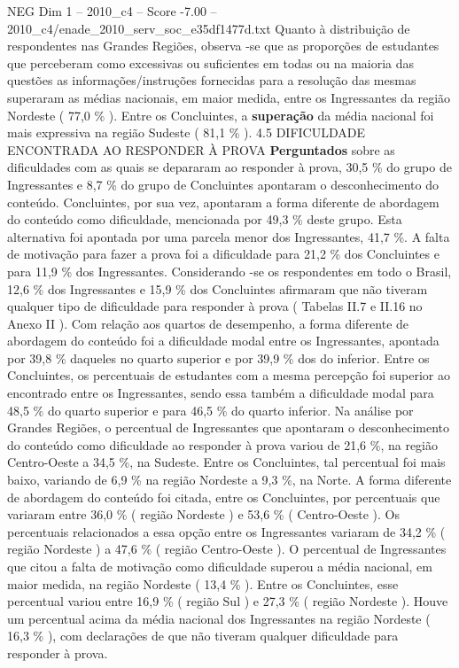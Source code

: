\begin{textsample}{NEG Dim 1 – 2010\_c4 – Score -7.00 – 2010\_c4/enade\_2010\_serv\_soc\_e35df1477d.txt}
Quanto à distribuição de respondentes nas Grandes Regiões, observa -se que as proporções de estudantes que perceberam como excessivas ou suficientes em todas ou na maioria das questões as informações/instruções fornecidas para a resolução das mesmas superaram as médias nacionais, em maior medida, entre os Ingressantes da região Nordeste ( 77,0 \% ).
Entre os Concluintes, a \textbf{superação} da média nacional foi mais expressiva na região Sudeste ( 81,1 \% ). 4.5 DIFICULDADE ENCONTRADA AO RESPONDER À PROVA \textbf{Perguntados} sobre as dificuldades com as quais se depararam ao responder à prova, 30,5 \% do grupo de Ingressantes e 8,7 \% do grupo de Concluintes apontaram o desconhecimento do conteúdo.
Concluintes, por sua vez, apontaram a forma diferente de abordagem do conteúdo como dificuldade, mencionada por 49,3 \% deste grupo.
Esta alternativa foi apontada por uma parcela menor dos Ingressantes, 41,7 \%.
A falta de motivação para fazer a prova foi a dificuldade para 21,2 \% dos Concluintes e para 11,9 \% dos Ingressantes.
Considerando -se os respondentes em todo o Brasil, 12,6 \% dos Ingressantes e 15,9 \% dos Concluintes afirmaram que não tiveram qualquer tipo de dificuldade para responder à prova ( Tabelas II.7 e II.16 no Anexo II ).
Com relação aos quartos de desempenho, a forma diferente de abordagem do conteúdo foi a dificuldade modal entre os Ingressantes, apontada por 39,8 \% daqueles no quarto superior e por 39,9 \% dos do inferior.
Entre os Concluintes, os percentuais de estudantes com a mesma percepção foi superior ao encontrado entre os Ingressantes, sendo essa também a dificuldade modal para 48,5 \% do quarto superior e para 46,5 \% do quarto inferior.
Na análise por Grandes Regiões, o percentual de Ingressantes que apontaram o desconhecimento do conteúdo como dificuldade ao responder à prova variou de 21,6 \%, na região Centro-Oeste a 34,5 \%, na Sudeste.
Entre os Concluintes, tal percentual foi mais baixo, variando de 6,9 \% na região Nordeste a 9,3 \%, na Norte.
A forma diferente de abordagem do conteúdo foi citada, entre os Concluintes, por percentuais que variaram entre 36,0 \% ( região Nordeste ) e 53,6 \% ( Centro-Oeste ).
Os percentuais relacionados a essa opção entre os Ingressantes variaram de 34,2 \% ( região Nordeste ) a 47,6 \% ( região Centro-Oeste ).
O percentual de Ingressantes que citou a falta de motivação como dificuldade superou a média nacional, em maior medida, na região Nordeste ( 13,4 \% ).
Entre os Concluintes, esse percentual variou entre 16,9 \% ( região Sul ) e 27,3 \% ( região Nordeste ).
Houve um percentual acima da média nacional dos Ingressantes na região Nordeste ( 16,3 \% ), com declarações de que não tiveram qualquer dificuldade para responder à prova.

\end{textsample}
